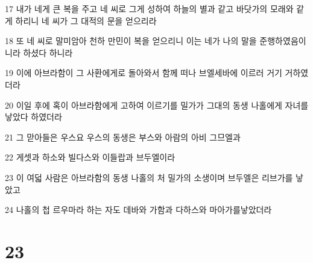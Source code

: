 \par 17 내가 네게 큰 복을 주고 네 씨로 그게 성하여 하늘의 별과 같고 바닷가의 모래와 같게 하리니 네 씨가 그 대적의 문을 얻으리라
\par 18 또 네 씨로 말미암아 천하 만민이 복을 얻으리니 이는 네가 나의 말을 준행하였음이니라 하셨다 하니라
\par 19 이에 아브라함이 그 사환에게로 돌아와서 함께 떠나 브엘세바에 이르러 거기 거하였더라
\par 20 이일 후에 혹이 아브라함에게 고하여 이르기를 밀가가 그대의 동생 나홀에게 자녀를 낳았다 하였더라
\par 21 그 맏아들은 우스요 우스의 동생은 부스와 아람의 아비 그므엘과
\par 22 게셋과 하소와 빌다스와 이들랍과 브두엘이라
\par 23 이 여덟 사람은 아브라함의 동생 나홀의 처 밀가의 소생이며 브두엘은 리브가를 낳았고
\par 24 나홀의 첩 르우마라 하는 자도 데바와 가함과 다하스와 마아가를낳았더라

\chapter{23}

